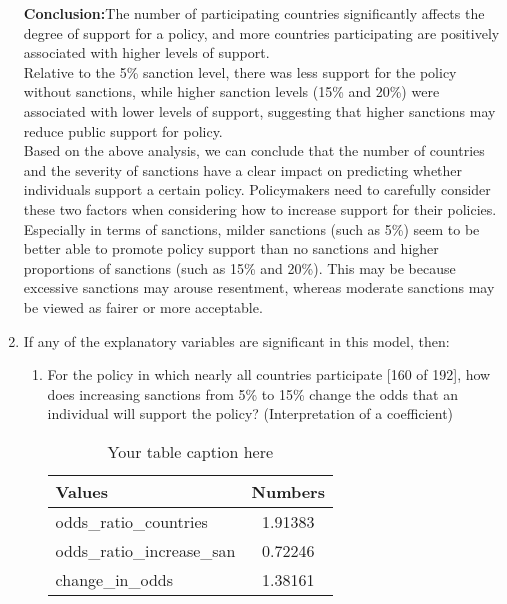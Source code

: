 \documentclass[12pt,letterpaper]{article}
\begin{document}
\begin{enumerate}
	\textbf{Conclusion:}The number of participating countries significantly affects the degree of support for a policy, and more countries participating are positively associated with higher levels of support.\\
	Relative to the 5\% sanction level, there was less support for the policy without sanctions, while higher sanction levels (15\% and 20\%) were associated with lower levels of support, suggesting that higher sanctions may reduce public support for policy.\\
	 
	Based on the above analysis, we can conclude that the number of countries and the severity of sanctions have a clear impact on predicting whether individuals support a certain policy. Policymakers need to carefully consider these two factors when considering how to increase support for their policies. Especially in terms of sanctions, milder sanctions (such as 5\%) seem to be better able to promote policy support than no sanctions and higher proportions of sanctions (such as 15\% and 20\%). This may be because excessive sanctions may arouse resentment, whereas moderate sanctions may be viewed as fairer or more acceptable.
	
	
	\item
	If any of the explanatory variables are significant in this model, then:
	\begin{enumerate}
		\item
		For the policy in which nearly all countries participate [160 of 192], how does increasing sanctions from 5\% to 15\% change the odds that an individual will support the policy? (Interpretation of a coefficient)
		

\begin{table}[h!]
	\caption{Your table caption here}
	\centering
	\begin{tabular}{|l|c|}
		
		\hline
		\textbf{Values} & \textbf{Numbers} \\
		\hline
		 odds\_ratio\_countries & 1.91383\\
		\hline
		odds\_ratio\_increase\_san & 0.72246 \\
		\hline
		change\_in\_odds & 1.38161 \\
		\hline
	\end{tabular}
	
	\label{table:1}
\end{table}



\end{enumerate}
\end{enumerate}
\end{document}
